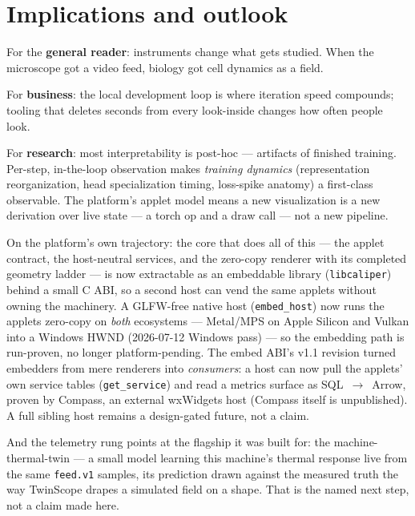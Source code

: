 \documentclass[11pt]{article}
\begin{document}
\section{Implications and outlook}

For the \textbf{general reader}: instruments change what gets studied. When
the microscope got a video feed, biology got cell dynamics as a field.

For \textbf{business}: the local development loop is where iteration speed
compounds; tooling that deletes seconds from every look-inside changes how
often people look.

For \textbf{research}: most interpretability is post-hoc --- artifacts of
finished training. Per-step, in-the-loop observation makes \emph{training
dynamics} (representation reorganization, head specialization timing,
loss-spike anatomy) a first-class observable. The platform's applet model
means a new visualization is a new derivation over live state --- a torch op
and a draw call --- not a new pipeline.

On the platform's own trajectory: the core that does all of this --- the applet
contract, the host-neutral services, and the zero-copy renderer with its
completed geometry ladder --- is now extractable as an embeddable library
(\texttt{libcaliper}) behind a small C ABI, so a second host can vend the same
applets without owning the machinery. A GLFW-free native host
(\texttt{embed\_host}) now runs the applets zero-copy on \emph{both} ecosystems
--- Metal/MPS on Apple Silicon and Vulkan into a Windows HWND (2026-07-12
Windows pass) --- so the embedding path is run-proven, no longer
platform-pending. The embed ABI's v1.1 revision turned embedders from mere
renderers into \emph{consumers}: a host can now pull the applets' own service
tables (\texttt{get\_service}) and read a metrics surface as
SQL~$\rightarrow$~Arrow, proven by Compass, an external wxWidgets host (Compass
itself is unpublished). A full sibling host remains a design-gated future, not
a claim.

And the telemetry rung points at the flagship it was built for: the
machine-thermal-twin --- a small model learning this machine's thermal response
live from the same \texttt{feed.v1} samples, its prediction drawn against the
measured truth the way TwinScope drapes a simulated field on a shape. That is
the named next step, not a claim made here.
\end{document}
